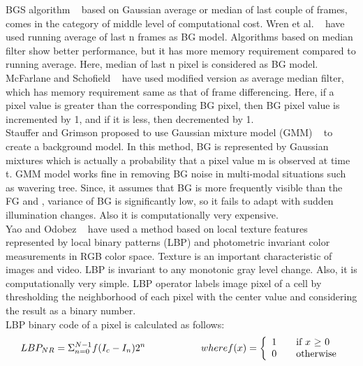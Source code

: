 \indent BGS algorithm ~\cite{10, 12, 13, 14, 15} based on Gaussian
average or median of last couple of frames, comes in the category of
middle level of computational cost. Wren et al. ~\cite{12} have used
running average of last n frames as BG model. Algorithms based on median
filter show better performance, but it has more memory requirement
compared to running average. Here, median of last n pixel is considered
as BG model.  McFarlane and Schofield ~\cite{14} have used modified
version as average median filter, which has memory requirement same as
that of frame differencing.  Here, if a pixel value is greater than the
corresponding BG pixel, then BG pixel value is incremented by 1, and if
it is less, then decremented by 1.\\

\indent  Stauffer and Grimson proposed to use Gaussian mixture model
(GMM) ~\cite{15} to create a background model. In this method, BG is
represented by Gaussian mixtures which is actually a probability that a
pixel value m is observed at time t. GMM model works fine in removing BG
noise in multi-modal situations such as wavering tree. Since, it assumes
that BG is more frequently visible than the FG and , variance of BG is
significantly low, so it fails to adapt with sudden illumination
changes. Also it is computationally very expensive.\\ 

\indent Yao and Odobez ~\cite{11} have used a method based on local
texture features represented by local binary patterns (LBP) and
photometric invariant color measurements in RGB color space. Texture is
an important characteristic of images and video. LBP is invariant to any
monotonic gray level change. Also, it is computationally very simple.
LBP operator labels image pixel of a cell by thresholding the
neighborhood of each pixel with the center value and considering the
result as a binary number.\\

LBP binary code of a pixel is calculated as follows:
\begin{equation}
LBP_{NR} = \Sigma _{n = 0} ^{N - 1} f(I_c - I_n) 2^n \hspace{20 mm} where f(x) = \left\{ 
  \begin{array}{l l}
     1 & \quad \text{if $x$ $\geq$  $0$}\\
     0 & \quad \text{otherwise}
   \end{array} \right.
\end{equation}

